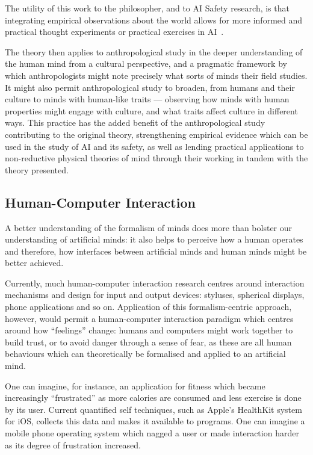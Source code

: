 The utility of this work to the philosopher, and to AI Safety research, is that integrating empirical observations about the world allows for more informed and practical thought experiments or practical exercises in AI~. \par

The theory then applies to anthropological study in the deeper understanding of the human mind from a cultural perspective, and a pragmatic framework by which anthropologists might note precisely what sorts of minds their field studies. It might also permit anthropological study to broaden, from humans and their culture to minds with human-like traits --- observing how minds with human properties might engage with culture, and what traits affect culture in different ways. This practice has the added benefit of the anthropological study contributing to the original theory, strengthening empirical evidence which can be used in the study of AI and its safety, as well as lending practical applications to non-reductive physical theories of mind through their working in tandem with the theory presented.\par

\subsection{Human-Computer Interaction} %
A better understanding of the formalism of minds does more than bolster our understanding of artificial minds: it also helps to perceive how a human operates and therefore, how interfaces between artificial minds and human minds might be better achieved.\par

Currently, much human-computer interaction research centres around interaction mechanisms and design for input and output devices: styluses, spherical displays, phone applications and so on. Application of this formalism-centric approach, however, would permit a human-computer interaction paradigm which centres around how ``feelings'' change: humans and computers might work together to build trust, or to avoid danger through a sense of fear, as these are all human behaviours which can theoretically be formalised and applied to an artificial mind.\par

One can imagine, for instance, an application for fitness which became increasingly ``frustrated'' as more calories are consumed and less exercise is done by its user. Current quantified self techniques, such as Apple's HealthKit system for iOS, collects this data and makes it available to programs. One can imagine a mobile phone operating system which nagged a user or made interaction harder as its degree of frustration increased.\par

